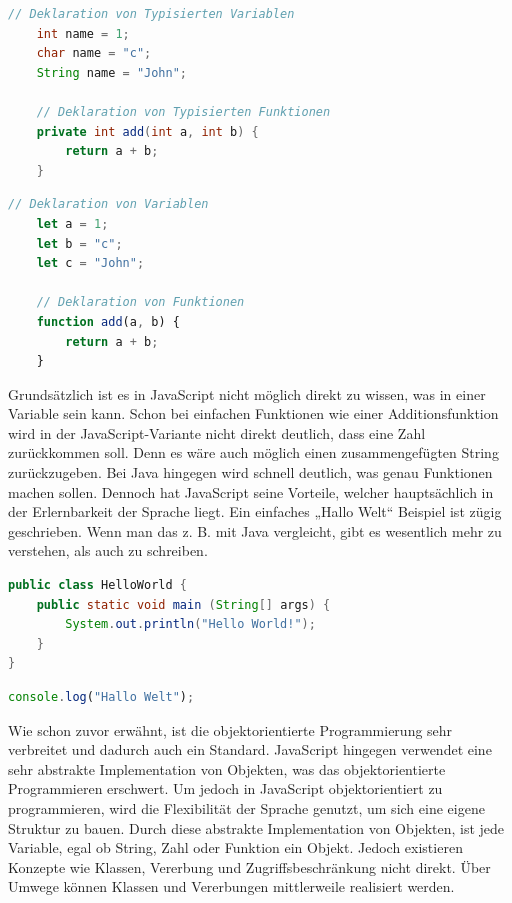 \begin{lstlisting}[caption=Java Variablen und Funktion deklarations Beispiel, label=variables-and-functions-example-java, language=Java]
    // Deklaration von Typisierten Variablen
    int name = 1;
    char name = "c";
    String name = "John";

    // Deklaration von Typisierten Funktionen
    private int add(int a, int b) {
        return a + b;
    }
\end{lstlisting}

\begin{lstlisting}[caption=JavaScript Variablen und Funktion deklarations Beispiel, label=variables-and-functions-example-javascript, language=JavaScript]
    // Deklaration von Variablen
    let a = 1;
    let b = "c";
    let c = "John";

    // Deklaration von Funktionen
    function add(a, b) {
        return a + b;
    }
\end{lstlisting}

Grundsätzlich ist es in JavaScript nicht möglich direkt zu wissen, was in einer Variable sein kann. Schon bei einfachen Funktionen wie einer Additionsfunktion wird in der JavaScript-Variante nicht direkt deutlich, dass eine Zahl zurückkommen soll. Denn es wäre auch möglich einen zusammengefügten String zurückzugeben. Bei Java hingegen wird schnell deutlich, was genau Funktionen machen sollen. Dennoch hat JavaScript seine Vorteile, welcher hauptsächlich in der Erlernbarkeit der Sprache liegt. Ein einfaches „Hallo Welt“ Beispiel ist zügig geschrieben. Wenn man das z. B. mit Java vergleicht, gibt es wesentlich mehr zu verstehen, als auch zu schreiben.

\begin{lstlisting}[caption=„Hallo Welt“ Beispiel in Java, label=hello-world-example-in-java, language=Java]
public class HelloWorld {
	public static void main (String[] args) {
		System.out.println("Hello World!");
	}
}
\end{lstlisting}

\begin{lstlisting}[caption=„Hallo Welt“ Beispiel in JavaScript, label=hello-world-example-in-javascript, language=JavaScript]
    console.log("Hallo Welt");
\end{lstlisting}

Wie schon zuvor erwähnt, ist die objektorientierte Programmierung sehr verbreitet und dadurch auch ein Standard. JavaScript hingegen verwendet eine sehr abstrakte Implementation von Objekten, was das objektorientierte Programmieren erschwert. Um jedoch in JavaScript objektorientiert zu programmieren, wird die Flexibilität der Sprache genutzt, um sich eine eigene Struktur zu bauen. Durch diese abstrakte Implementation von Objekten, ist jede Variable, egal ob String, Zahl oder Funktion ein Objekt. Jedoch existieren Konzepte wie Klassen, Vererbung und Zugriffsbeschränkung nicht direkt. Über Umwege können Klassen und Vererbungen mittlerweile realisiert werden.

